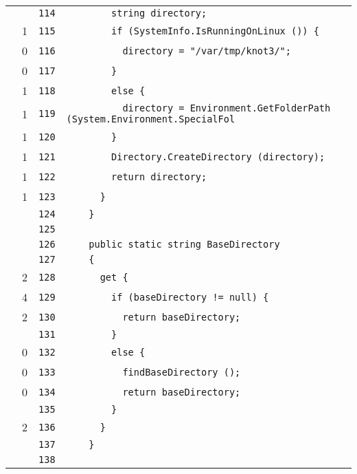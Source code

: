 \documentclass[a4paper,10pt]{article}
\begin{document}
\begin{longtable}[l]{lrrl}
\cellcolor{gray} &  & \verb~114~ & \verb~        string directory;~\\
\cellcolor{green} & 1 & \verb~115~ & \verb~        if (SystemInfo.IsRunningOnLinux ()) {~\\
\cellcolor{red} & 0 & \verb~116~ & \verb~          directory = "/var/tmp/knot3/";~\\
\cellcolor{red} & 0 & \verb~117~ & \verb~        }~\\
\cellcolor{green} & 1 & \verb~118~ & \verb~        else {~\\
\cellcolor{green} & 1 & \verb~119~ & \verb~          directory = Environment.GetFolderPath (System.Environment.SpecialFol~\\
\cellcolor{green} & 1 & \verb~120~ & \verb~        }~\\
\cellcolor{green} & 1 & \verb~121~ & \verb~        Directory.CreateDirectory (directory);~\\
\cellcolor{green} & 1 & \verb~122~ & \verb~        return directory;~\\
\cellcolor{green} & 1 & \verb~123~ & \verb~      }~\\
\cellcolor{gray} &  & \verb~124~ & \verb~    }~\\
\cellcolor{gray} &  & \verb~125~ & \verb~~\\
\cellcolor{gray} &  & \verb~126~ & \verb~    public static string BaseDirectory~\\
\cellcolor{gray} &  & \verb~127~ & \verb~    {~\\
\cellcolor{green} & 2 & \verb~128~ & \verb~      get {~\\
\cellcolor{green} & 4 & \verb~129~ & \verb~        if (baseDirectory != null) {~\\
\cellcolor{green} & 2 & \verb~130~ & \verb~          return baseDirectory;~\\
\cellcolor{gray} &  & \verb~131~ & \verb~        }~\\
\cellcolor{red} & 0 & \verb~132~ & \verb~        else {~\\
\cellcolor{red} & 0 & \verb~133~ & \verb~          findBaseDirectory ();~\\
\cellcolor{red} & 0 & \verb~134~ & \verb~          return baseDirectory;~\\
\cellcolor{gray} &  & \verb~135~ & \verb~        }~\\
\cellcolor{green} & 2 & \verb~136~ & \verb~      }~\\
\cellcolor{gray} &  & \verb~137~ & \verb~    }~\\
\cellcolor{gray} &  & \verb~138~ & \verb~~\\

\end{longtable}
\end{document}
